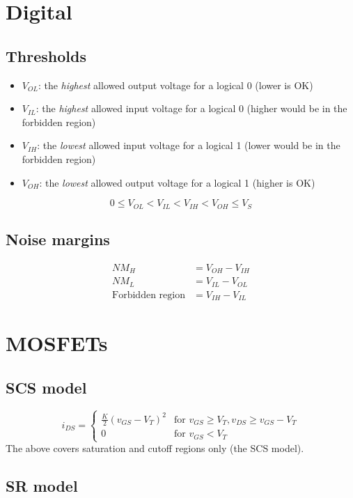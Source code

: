 \documentclass[12pt,a4paper]{report}
\begin{document}
\section{Digital}

\subsection{Thresholds}

\begin{itemize}
\item $V_{OL}$: the \emph{highest} allowed output voltage for a logical 0 (lower is OK)
\item $V_{IL}$: the \emph{highest} allowed input voltage for a logical 0 (higher would be in the forbidden region)
\item $V_{IH}$: the \emph{lowest} allowed input voltage for a logical 1 (lower would be in the forbidden region)
\item $V_{OH}$: the \emph{lowest} allowed output voltage for a logical 1 (higher is OK)
\end{itemize}

\[ 0 \le V_{OL} < V_{IL} < V_{IH} < V_{OH} \le V_S \]

\subsection{Noise margins}
\begin{align*}
  NM_H &= V_{OH} - V_{IH}\\
  NM_L &= V_{IL} - V_{OL}\\
\text{Forbidden region} &= V_{IH} - V_{IL}
\end{align*}

\section{MOSFETs}

\subsection{SCS model}
\[ 
 i_{DS} = \begin{cases}
   \frac{K}{2}(v_{GS} - V_T)^2 & \text{for $v_{GS} \ge V_T, v_{DS} \ge v_{GS} - V_T$} \\
   0 & \text{for $v_{GS} < V_T$}
 \end{cases}
\]
The above covers saturation and cutoff regions only (the SCS model).

\subsection{SR model}
\end{document}
